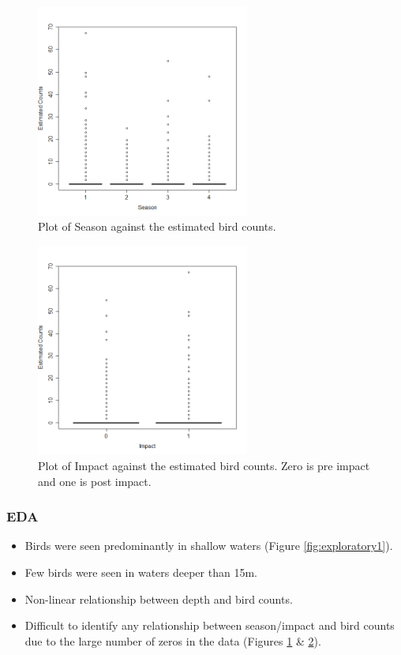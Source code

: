 \begin{frame}
\begin{figure}[h!]
  \centering
  \includegraphics[width=7cm]{danish/season.png}
\caption{Plot of Season against the estimated bird counts.}
\label{fig:exploratory2}
\end{figure}
\end{frame}

\begin{frame}
\begin{figure}[h!]
  \centering
  \includegraphics[width=7cm]{danish/impact.png}
\caption{Plot of Impact against the estimated bird counts. Zero is pre impact and one is post impact.}
\label{fig:exploratory3}
\end{figure}
\end{frame}

\begin{frame}
\frametitle{EDA}
\begin{itemize}
\item Birds were seen predominantly in shallow waters (Figure \ref{fig:exploratory1}).
\item Few birds were seen in waters deeper than 15m.  
\item Non-linear relationship between depth and bird counts.  
\item Difficult to identify any relationship between season/impact and bird counts due to the large number of zeros in the data (Figures \ref{fig:exploratory2} \&  \ref{fig:exploratory3}).
\end{itemize}
\end{frame}
